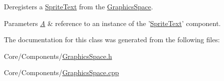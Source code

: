 Deregisters a \hyperlink{classDCEngine_1_1Components_1_1SpriteText}{Sprite\-Text} from the \hyperlink{classDCEngine_1_1Components_1_1GraphicsSpace}{Graphics\-Space}. 


\begin{DoxyParams}{Parameters}
{\em \hyperlink{classA}{A}} & reference to an instance of the '\hyperlink{classDCEngine_1_1Components_1_1SpriteText}{Sprite\-Text}' component. \\
\hline
\end{DoxyParams}


The documentation for this class was generated from the following files\-:\begin{DoxyCompactItemize}
\item 
Core/\-Components/\hyperlink{GraphicsSpace_8h}{Graphics\-Space.\-h}\item 
Core/\-Components/\hyperlink{GraphicsSpace_8cpp}{Graphics\-Space.\-cpp}\end{DoxyCompactItemize}
